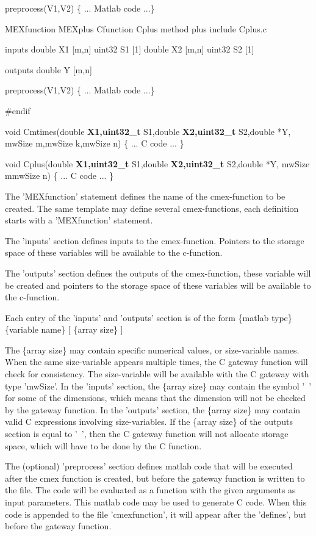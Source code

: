 preprocess(V1,V2)
 \{ ... Matlab code ...\}
 
MEXfunction MEXplus
Cfunction   Cplus
method      plus
include     Cplus.c
 
inputs
	double X1 [m,n]
	uint32 S1 [1]
	double X2 [m,n]
	uint32 S2 [1]
 
outputs
	double Y [m,n]
 
preprocess(V1,V2)
 \{ ... Matlab code ...\}
 
\#endif
 
void Cmtimes(double \textbf{X1,uint32\_t }S1,double \textbf{X2,uint32\_t }S2,double *Y,
              mwSize m,mwSize k,mwSize n)
\{ ... C code ... \}
 
void Cplus(double \textbf{X1,uint32\_t }S1,double \textbf{X2,uint32\_t }S2,double *Y,
           mwSize mmwSize n)
\{ ... C code ... \}
 
The 'MEXfunction' statement defines the name of the cmex-function
to be created. The same template may define several cmex-functions,
each definition starts with a 'MEXfunction' statement.
 
The 'inputs' section defines inputs to the cmex-function. Pointers to
the storage space of these variables will be available to the c-function.
 
The 'outputs' section defines the outputs of the cmex-function,
these variable will be created and pointers to the storage space of
these variables will be available to the c-function.
  
Each entry of the 'inputs' and 'outputs' section is of the form
   \{matlab type\} \{variable name\} [ \{array size\} ]
 
The \{array size\} may contain specific numerical values, or
size-variable names. When the same size-variable appears multiple
times, the C gateway function will check for consistency.
The size-variable will be available with the C gateway with type 'mwSize'.
In the 'inputs' section, the \{array size\} may contain the symbol '~'
for some of the dimensions, which means that the dimension will not be
checked by the gateway function.
In the 'outputs' section, the \{array size\} may contain valid C
expressions involving size-variables.
If the \{array size\} of the outputs section is equal to '~',
then the C gateway function will not allocate storage space,
which will have to be done by the C function.
 
The (optional) 'preprocess' section defines matlab code that
will be executed after the cmex function is created, but before
the gateway function is written to the file. The code will be evaluated
as a function with the given arguments as input parameters.
This matlab code may be used to generate C code. When this code
is appended to the file 'cmexfunction', it will appear after
the 'defines', but before the gateway function.
 
